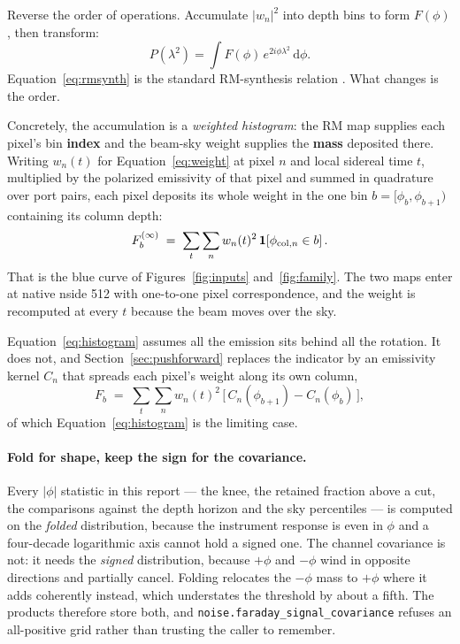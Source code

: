 \documentclass[11pt]{article}
\newcommand{\lamsq}{\ensuremath{\lambda^{2}}}
\newcommand{\code}[1]{\texttt{#1}}
\begin{document}
Reverse the order of operations. Accumulate $|w_n|^2$ into depth bins
to form $F(\phi)$, then transform:
\begin{equation}
  P(\lamsq) = \int F(\phi)\, e^{2i\phi\lamsq}\,\mathrm d\phi .
  \label{eq:rmsynth}
\end{equation}
Equation~\eqref{eq:rmsynth} is the standard RM-synthesis relation
\citep{burn1966,brentjens2005}. What changes is the order.

Concretely, the accumulation is a \emph{weighted histogram}: the RM map
supplies each pixel's bin \textbf{index} and the beam-sky weight
supplies the \textbf{mass} deposited there. Writing $w_n(t)$ for
Equation~\eqref{eq:weight} at pixel $n$ and local sidereal time $t$,
multiplied by the polarized emissivity of that pixel and summed in
quadrature over port pairs, each pixel deposits its whole weight in
the one bin $b = [\phi_b, \phi_{b+1})$ containing its column depth:
\begin{equation}
  F_b^{(\infty)} \;=\; \sum_{t}\sum_{n} w_n(t)^2 \,
  \mathbf{1}\!\left[\phi_{{\rm col},n} \in b\right] .
  \label{eq:histogram}
\end{equation}
That is the blue curve of Figures~\ref{fig:inputs}
and~\ref{fig:family}. The two maps enter at native nside 512 with
one-to-one pixel correspondence, and the weight is recomputed at every
$t$ because the beam moves over the sky.

Equation~\eqref{eq:histogram} assumes all the emission sits behind all
the rotation. It does not, and Section~\ref{sec:pushforward} replaces
the indicator by an emissivity kernel $C_n$ that spreads each pixel's
weight along its own column,
\begin{equation}
  F_b \;=\; \sum_{t}\sum_{n} w_n(t)^2 \,
  \bigl[\,C_n(\phi_{b+1}) - C_n(\phi_b)\,\bigr],
  \label{eq:deposit}
\end{equation}
of which Equation~\eqref{eq:histogram} is the limiting case.

\paragraph{Fold for shape, keep the sign for the covariance.} Every
$|\phi|$ statistic in this report --- the knee, the retained fraction
above a cut, the comparisons against the depth horizon and the sky
percentiles --- is computed on the \emph{folded} distribution, because
the instrument response is even in $\phi$ and a four-decade logarithmic
axis cannot hold a signed one. The channel covariance is not: it needs
the \emph{signed} distribution, because $+\phi$ and $-\phi$ wind in
opposite directions and partially cancel. Folding relocates the $-\phi$
mass to $+\phi$ where it adds coherently instead, which understates the
threshold by about a fifth. The products therefore store both, and
\code{noise.faraday\_signal\_covariance} refuses an all-positive grid
rather than trusting the caller to remember.
\end{document}

